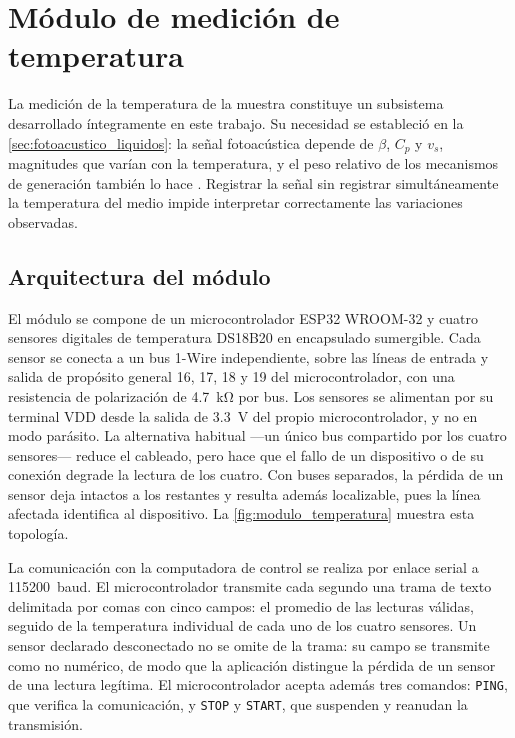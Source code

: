 \section{Módulo de medición de temperatura}
\label{sec:modulo_temperatura}

La medición de la temperatura de la muestra constituye un subsistema
desarrollado íntegramente en este trabajo. Su necesidad se estableció
en la \cref{sec:fotoacustico_liquidos}: la señal fotoacústica depende
de $\beta$, $C_p$ y $v_s$, magnitudes que varían con la temperatura,
y el peso relativo de los mecanismos de generación también lo hace
\cite{Astrath2023}. Registrar la señal sin registrar simultáneamente
la temperatura del medio impide interpretar correctamente las
variaciones observadas.

\subsection*{Arquitectura del módulo}

El módulo se compone de un microcontrolador ESP32 WROOM-32
\cite{EspressifWROOM32} y cuatro sensores digitales de temperatura
DS18B20 \cite{MaximDS18B20} en encapsulado sumergible.
Cada sensor se conecta a un bus 1-Wire independiente, sobre las líneas
de entrada y salida de propósito general 16, 17, 18 y 19 del
microcontrolador, con una resistencia de polarización de
\SI{4.7}{\kilo\ohm} por bus. Los sensores se alimentan por su terminal
VDD desde la salida de \SI{3.3}{\volt} del propio microcontrolador, y no
en modo parásito. La alternativa
habitual ---un único bus compartido por los cuatro sensores--- reduce
el cableado, pero hace que el fallo de un dispositivo o de su conexión
degrade la lectura de los cuatro. Con buses separados, la pérdida de un
sensor deja intactos a los restantes y resulta además localizable, pues
la línea afectada identifica al dispositivo. La
\cref{fig:modulo_temperatura} muestra esta topología.



La comunicación con la computadora de control se realiza por enlace
serial a \SI{115200}{baud}. El microcontrolador transmite cada segundo
una trama de texto delimitada por comas con cinco campos: el promedio
de las lecturas válidas, seguido de la temperatura individual de cada
uno de los cuatro sensores. Un sensor declarado desconectado no se
omite de la trama: su campo se transmite como no numérico, de modo que
la aplicación distingue la pérdida de un sensor de una lectura
legítima. El microcontrolador acepta además tres comandos:
\texttt{PING}, que verifica la comunicación, y \texttt{STOP} y
\texttt{START}, que suspenden y reanudan la transmisión.

